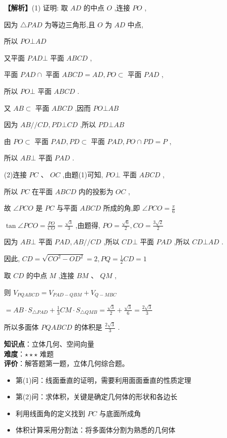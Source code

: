 \documentclass[10pt]{article}
\begin{document}
\textbf{【解析】}(1) 证明: 取 \({AD}\) 的中点 \(O\) ,连接 \({PO}\) ,

因为 \(\bigtriangleup {PAD}\) 为等边三角形,且 \(O\) 为 \({AD}\) 中点,

所以 \({PO} \bot  {AD}\)

又平面 \({PAD} \bot\) 平面 \({ABCD}\) ,

平面 \({PAD} \cap\) 平面 \({ABCD} = {AD},{PO} \subset\) 平面 \({PAD}\) ,

所以 \({PO} \bot\) 平面 \({ABCD}\) .

又 \({AB} \subset\) 平面 \({ABCD}\) ,因而 \({PO} \bot  {AB}\)

因为 \({AB}//{CD},{PD} \bot  {CD}\) ,所以 \({PD} \bot  {AB}\)

由 \({PO} \subset\) 平面 \({PAD},{PD} \subset\) 平面 \({PAD},{PO} \cap  {PD} = P\) ,

所以 \({AB} \bot\) 平面 \({PAD}\) .

(2)连接 \({PC}\text{ 、 }{OC}\) ,由题(1)可知, \({PO} \bot\) 平面 \({ABCD}\) ,

所以 \({PC}\) 在平面 \({ABCD}\) 内的投影为 \({OC}\) ,

故 \(\angle {PCO}\) 是 \({PC}\) 与平面 \({ABCD}\) 所成的角,即 \(\angle {PCO} = \frac{\pi }{6}\)

\(\tan \angle {PCO} = \frac{PO}{CO} = \frac{\sqrt{3}}{3}\) ,由题得, \({PO} = \frac{\sqrt{6}}{2},{CO} = \frac{3\sqrt{2}}{2}\)

因为 \({AB} \bot\) 平面 \({PAD},{AB}//{CD}\) ,所以 \({CD} \bot\) 平面 \({PAD}\) ,所以 \({CD} \bot  {AD}\) .

因此, \({CD} = \sqrt{C{O}^{2} - O{D}^{2}} = 2,{PQ} = \frac{1}{2}{CD} = 1\)

取 \({CD}\) 的中点 \(M\) ,连接 \({BM}\text{ 、 }{QM}\) ,

则 \({V}_{PQABCD} = {V}_{{PAD} - {QBM}} + {V}_{Q - {MBC}}\)

\(= {AB} \cdot  {S}_{\bigtriangleup {PAD}} + \frac{1}{3}{CM} \cdot  {S}_{\bigtriangleup {QMB}} = \frac{\sqrt{3}}{2} + \frac{\sqrt{3}}{6} = \frac{2\sqrt{3}}{3}\)

所以多面体 \({PQABCD}\) 的体积是 \(\frac{2\sqrt{3}}{3}\) .

\begin{analysisbox}[考点分析]
\textbf{知识点}：立体几何、空间向量\\
\textbf{难度}：\(\star\star\star\) 难题\\
\textbf{评价}：解答题第一题，立体几何综合题。
\begin{itemize}
\item 第(1)问：线面垂直的证明，需要利用面面垂直的性质定理
\item 第(2)问：求体积，关键是确定几何体的形状和各边长
\item 利用线面角的定义找到 \(PC\) 与底面所成角
\item 体积计算采用分割法：将多面体分割为熟悉的几何体
\end{itemize}
\end{analysisbox}
\end{document}
